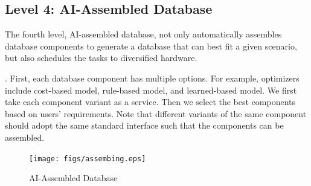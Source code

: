 

\subsection{Level 4: AI-Assembled Database}
\label{subsec: assemble}

The fourth level, AI-assembled database, not only automatically assembles database components to generate a database that can best fit a given scenario, but also schedules the tasks to diversified hardware. 



. First, each database component has multiple options. For example, optimizers include cost-based model, rule-based model, and learned-based model. We first take each component variant as a service. Then we select the best components based on users' requirements. Note that different variants of the same component should adopt the same standard interface such that the components can be assembled. 

\begin{figure}
\vspace{-2em}
  \begin{center}
    \texttt{[image: figs/assembing.eps]}
  \end{center}
\vspace{-3em}
\caption{AI-Assembled Database}
\label{fig:assemble}
\vspace{-1em}
\end{figure}



